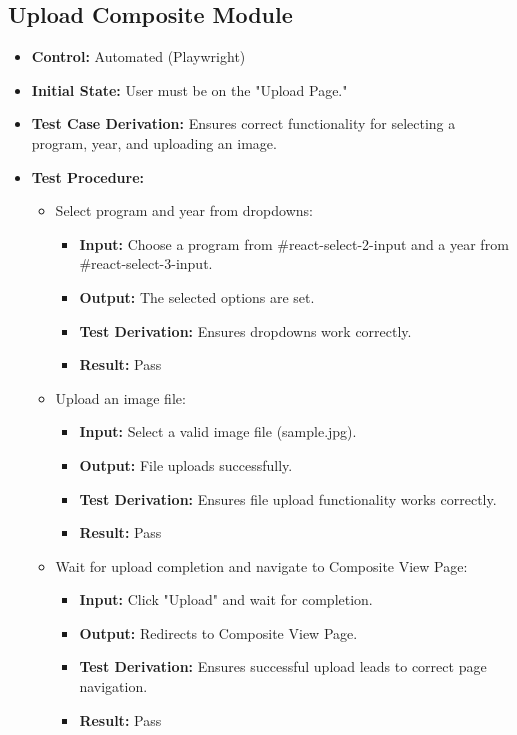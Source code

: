 \documentclass[12pt, titlepage]{article}
\begin{document}
\subsection{Upload Composite Module}
\begin{itemize}
    \item \textbf{Control: }Automated (Playwright)
    \item \textbf{Initial State: }User must be on the "Upload Page."
    \item \textbf{Test Case Derivation: }Ensures correct functionality for selecting a program, year, and uploading an image.
    \item \textbf{Test Procedure: }
    \begin{itemize}
        \item Select program and year from dropdowns:
        \begin{itemize}
            \item \textbf{Input: }Choose a program from \#react-select-2-input and a year from \#react-select-3-input.
            \item \textbf{Output: }The selected options are set.
            \item \textbf{Test Derivation: }Ensures dropdowns work correctly.
            \item \textbf{Result: }Pass
        \end{itemize}
        \item Upload an image file:
        \begin{itemize}
            \item \textbf{Input: }Select a valid image file (sample.jpg).
            \item \textbf{Output: }File uploads successfully.
            \item \textbf{Test Derivation: }Ensures file upload functionality works correctly.
            \item \textbf{Result: }Pass
        \end{itemize}
        \item Wait for upload completion and navigate to Composite View Page:
        \begin{itemize}
            \item \textbf{Input: }Click "Upload" and wait for completion.
            \item \textbf{Output: }Redirects to Composite View Page.
            \item \textbf{Test Derivation: }Ensures successful upload leads to correct page navigation.
            \item \textbf{Result: }Pass
        \end{itemize}
    \end{itemize}
\end{itemize}
\end{document}
